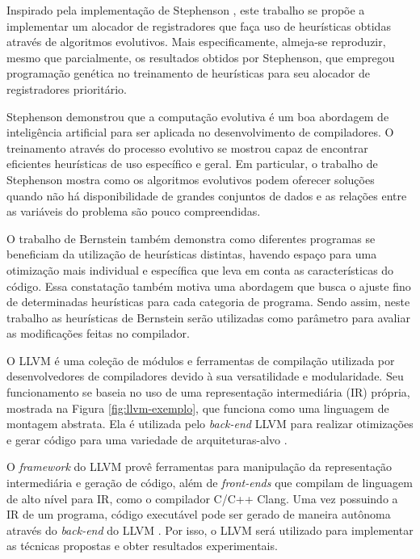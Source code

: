 \documentclass[
	12pt,				%
	openright,			%
	twoside,			%
	a4paper,			%
	tcc,			%
	]{ABNT-DC-UEL}
\begin{document}
Inspirado pela implementação de Stephenson \cite{amarasinghe:03, stephenson:06}, este trabalho se propõe a implementar um alocador de registradores que faça uso de heurísticas obtidas através de algoritmos evolutivos. Mais especificamente, almeja-se reproduzir, mesmo que parcialmente, os resultados obtidos por Stephenson, que empregou programação genética no treinamento de heurísticas para seu alocador de registradores prioritário.

Stephenson \cite{amarasinghe:03, stephenson:06} demonstrou que a computação evolutiva é um boa abordagem de inteligência artificial para ser aplicada no desenvolvimento de compiladores. O treinamento através do processo evolutivo se mostrou capaz de encontrar eficientes heurísticas de uso específico e geral. Em particular, o trabalho de Stephenson mostra como os algoritmos evolutivos podem oferecer soluções quando não há disponibilidade de grandes conjuntos de dados e as relações entre as variáveis do problema são pouco compreendidas.

O trabalho de Bernstein \cite{bernstein:89} também demonstra como diferentes programas se beneficiam da utilização de heurísticas distintas, havendo espaço para uma otimização mais individual e específica que leva em conta as características do código. Essa constatação também motiva uma abordagem que busca o ajuste fino de determinadas heurísticas para cada categoria de programa. Sendo assim, neste trabalho as heurísticas de Bernstein serão utilizadas como parâmetro para avaliar as modificações feitas no compilador.

O LLVM é uma coleção de módulos e ferramentas de compilação utilizada por desenvolvedores de compiladores devido à sua versatilidade e modularidade. Seu funcionamento se baseia no uso de uma representação intermediária (IR) própria, mostrada na Figura \ref{fig:llvm-exemplo}, que funciona como uma linguagem de montagem abstrata. Ela é utilizada pelo \textit{back-end} LLVM para realizar otimizações e gerar código para uma variedade de arquiteturas-alvo \cite{llvm:01, lattner:02, lattner:04}. 

O \textit{framework} do LLVM provê ferramentas para manipulação da representação intermediária e geração de código, além de \textit{front-ends} que compilam de linguagem de alto nível para IR, como o compilador C/C++ Clang. Uma vez possuindo a IR de um programa, código executável pode ser gerado de maneira autônoma através do \textit{back-end} do LLVM \cite{llvm:01}. Por isso, o LLVM será utilizado para implementar as técnicas propostas e obter resultados experimentais.
\end{document}
